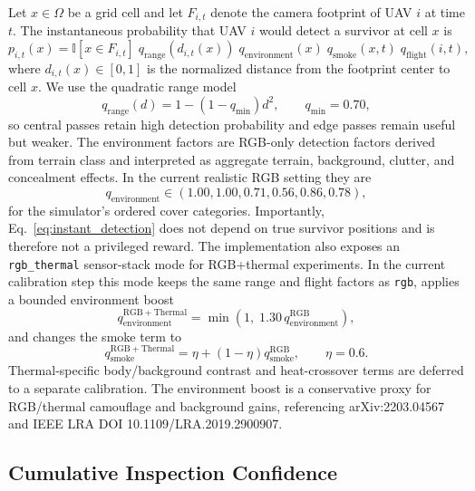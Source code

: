 \documentclass{article}
\newcommand{\grid}{\Omega}
\newcommand{\foot}{F}
\begin{document}
Let \(x \in \grid\) be a grid cell and let \(\foot_{i,t}\) denote the camera
footprint of UAV \(i\) at time \(t\). The instantaneous probability that UAV
\(i\) would detect a survivor at cell \(x\) is
\begin{equation}
    p_{i,t}(x)
    =
    \mathbb{I}[x \in \foot_{i,t}]
    \; q_{\mathrm{range}}(d_{i,t}(x))
    \; q_{\mathrm{environment}}(x)
    \; q_{\mathrm{smoke}}(x,t)
    \; q_{\mathrm{flight}}(i,t),
    \label{eq:instant_detection}
\end{equation}
where \(d_{i,t}(x) \in [0,1]\) is the normalized distance from the footprint
center to cell \(x\). We use the quadratic range model
\begin{equation}
    q_{\mathrm{range}}(d)
    =
    1 - (1 - q_{\min}) d^2,
    \qquad q_{\min}=0.70,
    \label{eq:range_model}
\end{equation}
so central passes retain high detection probability and edge passes remain
useful but weaker. The environment factors are RGB-only detection
factors derived from terrain class and interpreted as aggregate terrain,
background, clutter, and concealment effects. In the current realistic RGB
setting they are
\begin{equation}
    q_{\mathrm{environment}} \in
    (1.00, 1.00, 0.71, 0.56, 0.86, 0.78),
    \label{eq:environment_factors}
\end{equation}
for the simulator's ordered cover categories. Importantly, Eq.~\ref{eq:instant_detection}
does not depend on true survivor positions and is therefore not a privileged
reward.
The implementation also exposes an \texttt{rgb\_thermal} sensor-stack mode for
RGB+thermal experiments. In the current calibration step this mode keeps the
same range and flight factors as \texttt{rgb}, applies a bounded environment
boost
\[
    q_{\mathrm{environment}}^{\mathrm{RGB+Thermal}}
    =
    \min(1,\;1.30\,q_{\mathrm{environment}}^{\mathrm{RGB}}),
\]
and changes the smoke term to
\[
    q_{\mathrm{smoke}}^{\mathrm{RGB+Thermal}}
    =
    \eta + (1-\eta) q_{\mathrm{smoke}}^{\mathrm{RGB}},
    \qquad \eta = 0.6.
\]
Thermal-specific body/background contrast and heat-crossover terms are deferred
to a separate calibration. The environment boost is a conservative proxy for
RGB/thermal camouflage and background gains, referencing arXiv:2203.04567 and
IEEE LRA DOI 10.1109/LRA.2019.2900907.

\subsection{Cumulative Inspection Confidence}
\end{document}
